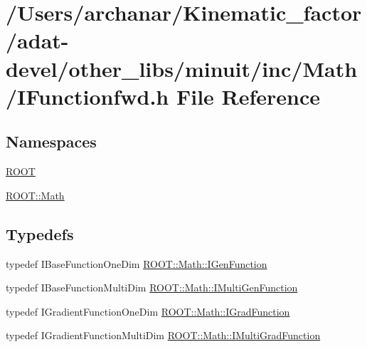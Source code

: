 \hypertarget{adat-devel_2other__libs_2minuit_2inc_2Math_2IFunctionfwd_8h}{}\section{/\+Users/archanar/\+Kinematic\+\_\+factor/adat-\/devel/other\+\_\+libs/minuit/inc/\+Math/\+I\+Functionfwd.h File Reference}
\label{adat-devel_2other__libs_2minuit_2inc_2Math_2IFunctionfwd_8h}
\subsection*{Namespaces}
\begin{DoxyCompactItemize}
\item 
 \mbox{\hyperlink{namespaceROOT}{R\+O\+OT}}
\item 
 \mbox{\hyperlink{namespaceROOT_1_1Math}{R\+O\+O\+T\+::\+Math}}
\end{DoxyCompactItemize}
\subsection*{Typedefs}
\begin{DoxyCompactItemize}
\item 
typedef I\+Base\+Function\+One\+Dim \mbox{\hyperlink{namespaceROOT_1_1Math_afe6400b4439b79d54c41fb9f5c5af171}{R\+O\+O\+T\+::\+Math\+::\+I\+Gen\+Function}}
\item 
typedef I\+Base\+Function\+Multi\+Dim \mbox{\hyperlink{namespaceROOT_1_1Math_aec22897f3d759f7c284893c81d980799}{R\+O\+O\+T\+::\+Math\+::\+I\+Multi\+Gen\+Function}}
\item 
typedef I\+Gradient\+Function\+One\+Dim \mbox{\hyperlink{namespaceROOT_1_1Math_a2ff34b4dac0c7103abd9f3053e4666af}{R\+O\+O\+T\+::\+Math\+::\+I\+Grad\+Function}}
\item 
typedef I\+Gradient\+Function\+Multi\+Dim \mbox{\hyperlink{namespaceROOT_1_1Math_a014e019aaf9304a00e9231bd9ed232fb}{R\+O\+O\+T\+::\+Math\+::\+I\+Multi\+Grad\+Function}}
\end{DoxyCompactItemize}
